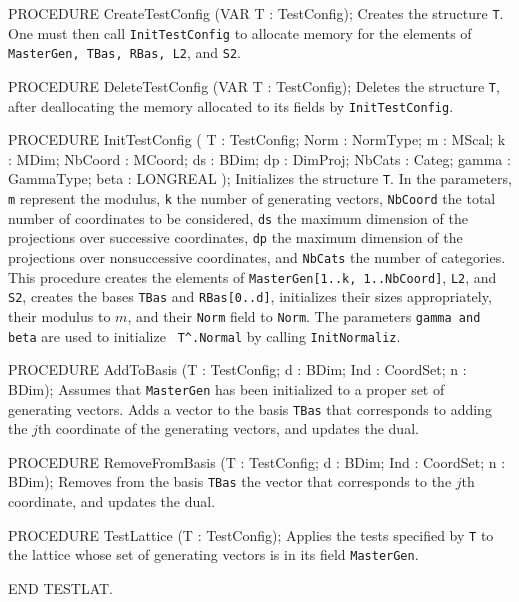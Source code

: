 PROCEDURE CreateTestConfig (VAR T : TestConfig);
\endcode
  \tab  
  Creates the structure {\tt T}.  One must then call
  {\tt InitTestConfig} to allocate memory for the elements of
  {\tt MasterGen, TBas, RBas, L2}, and {\tt S2}.
  \endtab
\code

PROCEDURE DeleteTestConfig (VAR T : TestConfig);
\endcode
  \tab  
  Deletes the structure {\tt T}, after deallocating the memory
  allocated to its fields by {\tt InitTestConfig}.
  \endtab
\code

PROCEDURE InitTestConfig 
  ( T : TestConfig;  Norm : NormType;
    m  : MScal;   k  : MDim;      NbCoord : MCoord;  
    ds : BDim;    dp : DimProj;   NbCats  : Categ;
    gamma : GammaType;   beta : LONGREAL
  );
\endcode
  \tab
  Initializes the structure {\tt T}.
  In the parameters, {\tt m} represent the modulus, {\tt k} the number of
  generating vectors, 
  {\tt NbCoord} the total number of coordinates to be considered,
  {\tt ds} the maximum dimension of the projections over successive 
  coordinates,
  {\tt dp} the maximum dimension of the projections over nonsuccessive
  coordinates,
  and {\tt NbCats} the number of categories.
  This procedure creates the elements of {\tt MasterGen[1..k, 1..NbCoord]},
  {\tt L2}, and {\tt S2},
  creates the bases {\tt TBas} and {\tt RBas[0..d]},
  initializes their sizes appropriately, their modulus to $m$,
  and their {\tt Norm} field to {\tt Norm}.
  The parameters {\tt gamma {\rm and} beta} are used to initialize {\tt
  T\^{}.Normal} by calling {\tt InitNormaliz}.
  \endtab
\code

PROCEDURE AddToBasis (T : TestConfig;  d : BDim;  Ind : CoordSet;  n : BDim);
\endcode
  \tab
  Assumes that {\tt MasterGen} has been initialized to a proper set
  of generating vectors.
  Adds a vector to the basis {\tt TBas} that corresponds to adding 
  the $j$th coordinate of the generating vectors, and updates the dual.
  \endtab
\code

PROCEDURE RemoveFromBasis (T : TestConfig; d : BDim;  Ind : CoordSet; n : BDim);
\endcode
  \tab
  Removes from the basis {\tt TBas} the vector that corresponds to the 
  $j$th coordinate, and updates the dual.
  \endtab
\code

PROCEDURE TestLattice (T : TestConfig);
\endcode
 \tab  Applies the tests specified by {\tt T} to the lattice
   whose set of generating vectors is in its field \verb=MasterGen=.
 \endtab
\code

END TESTLAT.
\endcode
